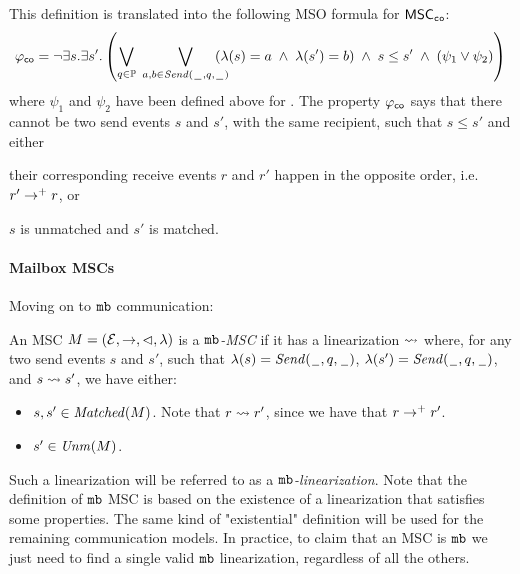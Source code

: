 This definition is translated into the following MSO formula for $\mathsf{MSC}_{\mathtt{co}}$:
\[
	\varphi_{\mathsf{co}} = \neg \exists s.\exists s'. \left(
	\bigvee_{\substack{q \in \mathbb{P}}}\;
	\bigvee_{\substack{a,b \in {\mathit{Send}(\hspace{0.1em}\underline{\hspace{0.5em}}\hspace{0.1em},q,\hspace{0.1em}\underline{\hspace{0.5em}}\hspace{0.1em})}}}\hspace{-1em}
	(\lambda(s) = a \;\wedge\; \lambda(s') = b) \;\wedge\; s \le s' \;\wedge\;
	(\psi_1 \vee \psi_2 ) 	
	\right)
\]
where $\psi_1$ and $\psi_2$ have been defined above for \pp. The property $\varphi_{\mathsf{co}}$ says that there cannot be two send events $s$ and $s'$, with the same recipient, such that $s \le s'$ and either
\begin{enumerate*}[label={(\roman*)}]
	\item their corresponding receive events $r$ and $r'$ happen in the opposite order, i.e. $r' \to^+ r$, or
	\item $s$ is unmatched and $s'$ is matched.
\end{enumerate*}


\paragraph{\bf Mailbox MSCs}
Moving on to $\mathtt{mb}$ communication:

\begin{definition}\label{def:mb_msc}
An MSC $M = (\mathcal{E},\to,\lhd,\lambda)$ is a \emph{$\mathtt{mb}$-MSC} if it has a linearization $\rightsquigarrow$ where, for any two send events $s$ and $s'$, such that $\lambda(s)={\mathit{Send}(\hspace{0.1em}\underline{\hspace{0.5em}}\hspace{0.1em},q,\hspace{0.1em}\underline{\hspace{0.5em}}\hspace{0.1em})}$, $\lambda(s')={\mathit{Send}(\hspace{0.1em}\underline{\hspace{0.5em}}\hspace{0.1em},q,\hspace{0.1em}\underline{\hspace{0.5em}}\hspace{0.1em})}$, and $s \rightsquigarrow s'$, we have either:
\begin{itemize}%
	\item $s,s' \in \mathit{Matched}(M)$. Note that $r \rightsquigarrow r'$, since we have that $r \to^+ r'$.
	\item $s' \in \mathit{Unm}(M)$.
\end{itemize}
\end{definition}


Such a linearization will be referred to as a \emph{$\mathtt{mb}$-linearization}. Note that the definition of $\mathtt{mb}$ MSC is based on the existence of a linearization that satisfies some properties. The same kind of "existential" definition will be used for the remaining communication models. In practice, to claim that an MSC is $\mathtt{mb}$ we just need to find a single valid $\mathtt{mb}$ linearization, regardless of all the others.%



